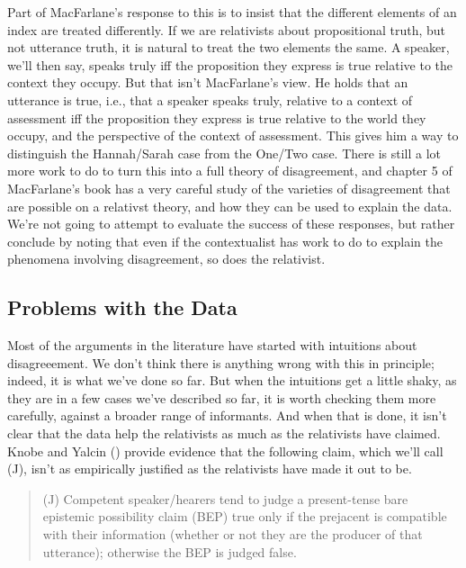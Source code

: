 \documentclass[
  10pt,
  letterpaper,
  DIV=11,
  numbers=noendperiod,
  twoside]{scrartcl}
\begin{document}
Part of MacFarlane's response to this is to insist that the different
elements of an index are treated differently. If we are relativists
about propositional truth, but not utterance truth, it is natural to
treat the two elements the same. A speaker, we'll then say, speaks truly
iff the proposition they express is true relative to the context they
occupy. But that isn't MacFarlane's view. He holds that an utterance is
true, i.e., that a speaker speaks truly, relative to a context of
assessment iff the proposition they express is true relative to the
world they occupy, and the perspective of the context of assessment.
This gives him a way to distinguish the Hannah/Sarah case from the
One/Two case. There is still a lot more work to do to turn this into a
full theory of disagreement, and chapter 5 of MacFarlane's book has a
very careful study of the varieties of disagreement that are possible on
a relativst theory, and how they can be used to explain the data. We're
not going to attempt to evaluate the success of these responses, but
rather conclude by noting that even if the contextualist has work to do
to explain the phenomena involving disagreement, so does the relativist.

\subsection{Problems with the Data}\label{problemswiththedata}

Most of the arguments in the literature have started with intuitions
about disagreeement. We don't think there is anything wrong with this in
principle; indeed, it is what we've done so far. But when the intuitions
get a little shaky, as they are in a few cases we've described so far,
it is worth checking them more carefully, against a broader range of
informants. And when that is done, it isn't clear that the data help the
relativists as much as the relativists have claimed. Knobe and Yalcin
() provide evidence that the
following claim, which we'll call (J), isn't as empirically justified as
the relativists have made it out to be.

\begin{quote}
(J) Competent speaker/hearers tend to judge a present-tense bare
epistemic possibility claim (BEP) true only if the prejacent is
compatible with their information (whether or not they are the producer
of that utterance); otherwise the BEP is judged false.
\end{quote}
\end{document}

